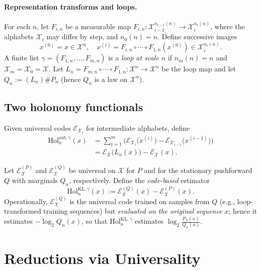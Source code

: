 \documentclass[11pt]{article}
\newcommand{\X}{\mathcal{X}}
\newcommand{\1}{\mathbbm{1}}
\newcommand{\code}{\mathcal{E}}
\newcommand{\push}{\#}
\begin{document}
\paragraph{Representation transforms and loops.}
For each $n$, let $F_{i,n}$ be a measurable map $F_{i,n}:\X_{i-1}^{n_{i-1}(n)}\to\X_i^{n_i(n)}$, where the alphabets $\X_i$ may differ by step, and $n_0(n)=n$. Define successive images
\[
x^{(0)} = x \in \X^n,\quad x^{(i)} = F_{i,n}\circ\cdots\circ F_{1,n}(x^{(0)}) \in \X_i^{n_i(n)}.
\]
A finite list $\gamma=(F_{1,n},\ldots,F_{m,n})$ is a \emph{loop at scale $n$} if $n_m(n)=n$ and $\X_m=\X_0=\X$. Let $L_n=F_{m,n}\circ\cdots\circ F_{1,n}:\X^n\to\X^n$ be the loop map and let $Q_n := (L_n)\push P_n$ (hence $Q_n$ is a law on $\X^n$).

\subsection{Two holonomy functionals}

\begin{definition}\label{def:holonomy-out}
Given universal codes $\code_{\X_i}$ for intermediate alphabets, define
\begin{align*}
\mathrm{Hol}_{n}^{\mathrm{out},\gamma}(x)
  &= \sum_{i=1}^m \Big(\code_{\X_i}\big(x^{(i)}\big)-\code_{\X_{i-1}}\big(x^{(i-1)}\big)\Big)\\
  &= \code_{\X}\big(L_n(x)\big)-\code_{\X}(x).
\end{align*}
\end{definition}

\begin{definition}\label{def:holonomy-kl}
Let $\code_\X^{(P)}$ and $\code_\X^{(Q)}$ be universal on $\X$ for $P$ and for the stationary pushforward $Q$ with marginals $Q_n$, respectively. Define the \emph{code-based} estimator
\[
\mathrm{Hol}_{n}^{\mathrm{KL},\gamma}(x) := \code_\X^{(Q)}(x) - \code_\X^{(P)}(x).
\]
Operationally, $\code_\X^{(Q)}$ is the universal code trained on samples from $Q$ (e.g., loop-transformed training sequences) but \emph{evaluated on the original sequence} $x$; hence it estimates $-\log_2 Q_n(x)$, so that $\mathrm{Hol}_{n}^{\mathrm{KL},\gamma}$ estimates $\log_2 \frac{P_n(x)}{Q_n(x)}$.
\end{definition}

\section{Reductions via Universality}
\end{document}
